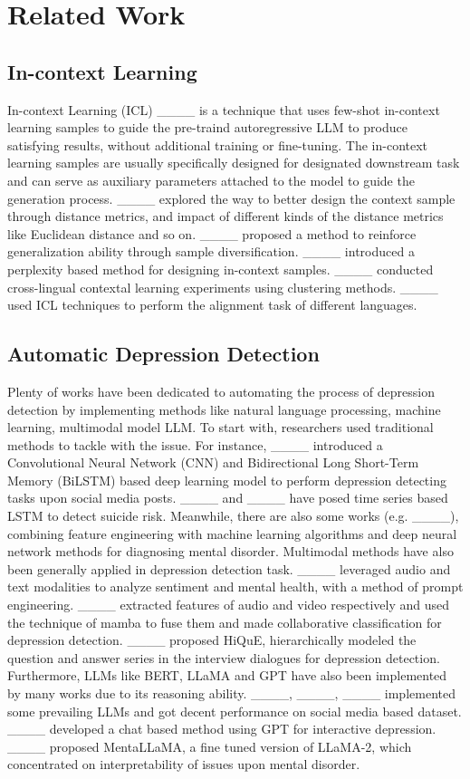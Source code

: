 \section{Related Work}
\subsection{In-context Learning}
In-context Learning (ICL) ____ is a technique that uses few-shot in-context learning samples to guide the pre-traind autoregressive LLM to produce satisfying results, without additional training or fine-tuning. The in-context learning samples are usually specifically designed for designated downstream task and can serve as auxiliary parameters attached to the model to guide the generation process. ____ explored the way to better design the context sample through distance metrics, and impact of different kinds of the distance metrics like Euclidean distance and so on. ____ proposed a method to reinforce generalization ability through sample diversification. ____ introduced a perplexity based method for designing in-context samples. ____ conducted cross-lingual contextal learning experiments using clustering methods. ____ used ICL techniques to perform the alignment task of different languages.

\subsection{Automatic Depression Detection}
Plenty of works have been dedicated to automating the process of depression detection by implementing methods like natural language processing, machine learning, multimodal model LLM. To start with, researchers used traditional methods to tackle with the issue. For instance, ____ introduced a Convolutional Neural Network (CNN) and Bidirectional Long Short-Term Memory (BiLSTM) based deep learning model to perform depression detecting tasks upon social media posts. ____ and ____ have posed time series based LSTM to detect suicide risk. Meanwhile, there are also some works (e.g. ____), combining feature engineering with machine learning algorithms and deep neural network methods for diagnosing mental disorder. Multimodal methods have also been generally applied in depression detection task. ____ leveraged audio and text modalities to analyze sentiment and mental health, with a method of prompt engineering. ____ extracted features of audio and video respectively and used the technique of mamba to fuse them and made collaborative classification for depression detection. ____ proposed HiQuE, hierarchically modeled the question and answer series in the interview dialogues for depression detection. Furthermore, LLMs like BERT, LLaMA and GPT have also been implemented by many works due to its reasoning ability. ____, ____, ____ implemented some prevailing LLMs and got decent performance on social media based dataset. ____ developed a chat based method using GPT for interactive depression. ____ proposed MentaLLaMA, a fine tuned version of LLaMA-2, which concentrated on interpretability of issues upon mental disorder. 


